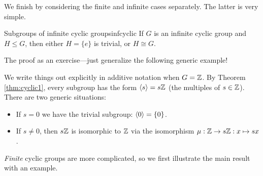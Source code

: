 We finish by considering the finite and infinite cases separately. The latter is very simple.

\begin{cor}{Subgroups of infinite cyclic groups}{infcyclic}
	If $G$ is an infinite cyclic group and $H\le G$, then either $H=\{e\}$ is trivial, or $H\cong G$.
\end{cor}

The proof as an exercise---just generalize the following generic example!

\begin{example}{}{}
	We write things out explicitly in additive notation when $G=\mathbb{Z}$. By Theorem \ref{thm:cyclic1}, every subgroup has the form $\left\langle s\right\rangle=s\mathbb{Z}$ (the multiples of $s\in\mathbb{Z}$). There are two generic situations:
	\begin{itemize}
	  \item If $s=0$ we have the trivial subgroup: $\left\langle 0\right\rangle=\{0\}$.
	  \item If $s\neq 0$, then $s\mathbb{Z}$ is isomorphic to $\mathbb{Z}$ via the isomorphism $\mu:\mathbb{Z}\to s\mathbb{Z}:x\mapsto sx$.
	\end{itemize}
\end{example}


\goodbreak


\emph{Finite} cyclic groups are more complicated, so we first illustrate the main result with an example.

